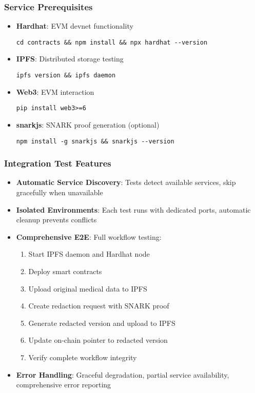 \subsubsection{Service Prerequisites}

\begin{itemize}
    \item \textbf{Hardhat}: EVM devnet functionality
    \begin{verbatim}
cd contracts && npm install && npx hardhat --version
    \end{verbatim}
    
    \item \textbf{IPFS}: Distributed storage testing
    \begin{verbatim}
ipfs version && ipfs daemon
    \end{verbatim}
    
    \item \textbf{Web3}: EVM interaction
    \begin{verbatim}
pip install web3>=6
    \end{verbatim}
    
    \item \textbf{snarkjs}: SNARK proof generation (optional)
    \begin{verbatim}
npm install -g snarkjs && snarkjs --version
    \end{verbatim}
\end{itemize}

\subsubsection{Integration Test Features}

\begin{itemize}
    \item \textbf{Automatic Service Discovery}: Tests detect available services, skip gracefully when unavailable
    \item \textbf{Isolated Environments}: Each test runs with dedicated ports, automatic cleanup prevents conflicts
    \item \textbf{Comprehensive E2E}: Full workflow testing:
    \begin{enumerate}
        \item Start IPFS daemon and Hardhat node
        \item Deploy smart contracts
        \item Upload original medical data to IPFS
        \item Create redaction request with SNARK proof
        \item Generate redacted version and upload to IPFS
        \item Update on-chain pointer to redacted version
        \item Verify complete workflow integrity
    \end{enumerate}
    \item \textbf{Error Handling}: Graceful degradation, partial service availability, comprehensive error reporting
\end{itemize}

